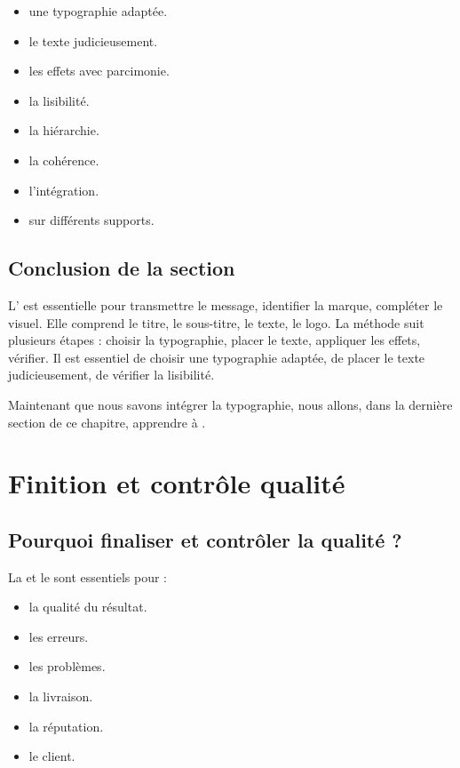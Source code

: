 \begin{itemize}
    \item {} une typographie adaptée.
    \item {} le texte judicieusement.
    \item {} les effets avec parcimonie.
    \item {} la lisibilité.
    \item {} la hiérarchie.
    \item {} la cohérence.
    \item {} l'intégration.
    \item {} sur différents supports.
\end{itemize}

\subsection*{Conclusion de la section}

L' est essentielle pour transmettre le message, identifier la marque, compléter le visuel. Elle comprend le titre, le sous-titre, le texte, le logo. La méthode suit plusieurs étapes : choisir la typographie, placer le texte, appliquer les effets, vérifier. Il est essentiel de choisir une typographie adaptée, de placer le texte judicieusement, de vérifier la lisibilité.

Maintenant que nous savons intégrer la typographie, nous allons, dans la dernière section de ce chapitre, apprendre à .

\section{Finition et contrôle qualité}

\subsection{Pourquoi finaliser et contrôler la qualité ?}

La  et le  sont essentiels pour :

\begin{itemize}
    \item {} la qualité du résultat.
    \item {} les erreurs.
    \item {} les problèmes.
    \item {} la livraison.
    \item {} la réputation.
    \item {} le client.
\end{itemize}

